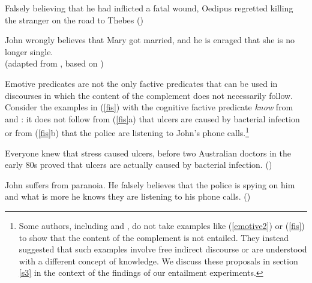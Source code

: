 \documentclass[11pt,fleqn]{article}
\newcommand{\6}{\mbox{$[\hspace*{-.6mm}[$}}
\newcommand{\9}{\mbox{$]\hspace*{-.6mm}]$}}
\begin{document}
\begin{itemize}
\begin{exe}
\begin{xlist}
\ex Falsely believing that he had inflicted a fatal wound, Oedipus regretted killing the stranger on the road to Thebes \hfill (\citealt{klein1975})

\ex John wrongly believes that Mary got married, and he is enraged that she is no longer single. \\ \hspace*{.2cm} \hfill (adapted from \citealt{egre2008}, based on \citealt{schlenker03})

\end{xlist}

\end{exe}
Emotive predicates are not the only factive predicates that can be used in discourses in which the content of the complement does not necessarily follow. Consider the examples in (\ref{fis}) with the cognitive factive predicate {\em know} from  \citealt{hazlett2010} and \citealt{abrusan2011}:  it does not follow from (\ref{fis}a) that ulcers are caused by bacterial infection or from (\ref{fis}b) that the police are listening to John's phone calls.\footnote{Some authors, including \citet{gazdar79a} and \citet{abrusan2011}, do not take examples like (\ref{emotive2}) or (\ref{fis}) to show that the content of the complement is not entailed. They instead suggested that such examples involve free indirect discourse or are understood with a different concept of knowledge. We discuss these proposals in section \ref{s3} in the context of the findings of our entailment experiments.}

\begin{exe}
\ex\label{fis}
\begin{xlist}

\ex Everyone knew that stress caused ulcers, before two Australian doctors in the early 80s proved that ulcers are actually caused by bacterial infection. \hfill (\citealt[501]{hazlett2010})

\ex John suffers from paranoia. He falsely believes that the police is spying on him and what is more he knows they are listening to his phone calls. \hfill (\citealt[514]{abrusan2011})




\end{xlist}
\end{exe}
\end{itemize}
\end{document}
